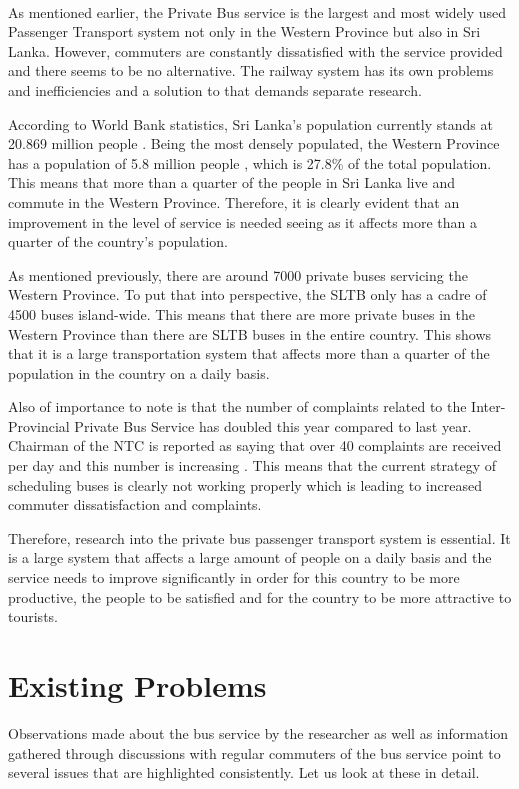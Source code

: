 \paragraph{} As mentioned earlier, the Private Bus service is the largest and most widely used Passenger Transport system not only in the Western Province but also in Sri Lanka. However, commuters are constantly dissatisfied with the service provided and there seems to be no alternative. The railway system has its own problems and inefficiencies and a solution to that demands separate research.

According to World Bank statistics, Sri Lanka's population currently stands at 20.869 million people \cite{WorldBank2013}. Being the most densely populated, the Western Province has a population of 5.8 million people \cite{DepartmentofCensusandStatistics2012}, which is 27.8\% of the total population. This means that more than a quarter of the people in Sri Lanka live and commute in the Western Province. Therefore, it is clearly evident that an improvement in the level of service is needed seeing as it affects more than a quarter of the country's population.

As mentioned previously, there are around 7000 private buses servicing the Western Province. To put that into perspective, the SLTB only has a cadre of 4500 buses island-wide. This means that there are more private buses in the Western Province than there are SLTB buses in the entire country. This shows that it is a large transportation system that affects more than a quarter of the population in the country on a daily basis.

Also of importance to note is that the number of complaints related to the Inter-Provincial Private Bus Service has doubled this year compared to last year. Chairman of the NTC is reported as saying that over 40 complaints are received per day and this number is increasing \cite{Wickremasekara2012, Range2012}. This means that the current strategy of scheduling buses is clearly not working properly which is leading to increased commuter dissatisfaction and complaints.

Therefore, research into the private bus passenger transport system is essential. It is a large system that affects a large amount of people on a daily basis and the service needs to improve significantly in order for this country to be more productive, the people to be satisfied and for the country to be more attractive to tourists.

\section{Existing Problems}
\label{section-ExistingProblems}
Observations made about the bus service by the researcher as well as information gathered through discussions with regular commuters of the bus service point to several issues that are highlighted consistently. Let us look at these in detail.

